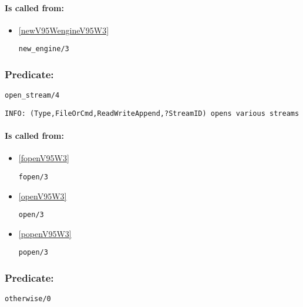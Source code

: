 \paragraph{Is called from:} 
\begin{itemize}
\item \ref{newV95WengineV95W3} 
\begin{verbatim}
new_engine/3
\end{verbatim}

\end{itemize}

\subsubsection{Predicate:} \label{openV95WstreamV95W4}

\begin{verbatim}
open_stream/4
\end{verbatim}

{\small \begin{verbatim}
INFO: (Type,FileOrCmd,ReadWriteAppend,?StreamID) opens various streams

\end{verbatim}}
\paragraph{Is called from:} 
\begin{itemize}
\item \ref{fopenV95W3} 
\begin{verbatim}
fopen/3
\end{verbatim}

\item \ref{openV95W3} 
\begin{verbatim}
open/3
\end{verbatim}

\item \ref{popenV95W3} 
\begin{verbatim}
popen/3
\end{verbatim}

\end{itemize}

\subsubsection{Predicate:} \label{otherwiseV95W0}

\begin{verbatim}
otherwise/0
\end{verbatim}


